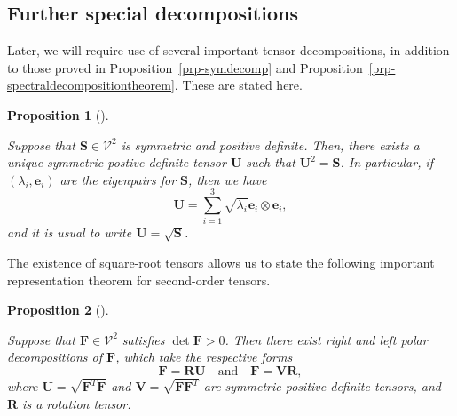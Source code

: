 \documentclass[
  letterpaper,
  DIV=11,
  numbers=noendperiod]{scrreprt}
\theoremstyle{plain}
\newtheorem{proposition}{Proposition}[chapter]
\theoremstyle{remark}
\begin{document}
\subsection{Further special
decompositions}\label{further-special-decompositions}

Later, we will require use of several important tensor decompositions,
in addition to those proved in Proposition~\ref{prp-symdecomp} and
Proposition~\ref{prp-spectraldecompositiontheorem}. These are stated
here.

\begin{proposition}[]\protect\hypertarget{prp-squareroot}{}\label{prp-squareroot}

Suppose that \({\boldsymbol{S}}\in{\mathcal{V}}^2\) is symmetric and
positive definite. Then, there exists a unique symmetric postive
definite tensor \({\boldsymbol{U}}\) such that
\({\boldsymbol{U}}^2={\boldsymbol{S}}\). In particular, if
\((\lambda_i,{\boldsymbol{e}}_i)\) are the eigenpairs for
\({\boldsymbol{S}}\), then we have
\[{\boldsymbol{U}}= \sum_{i=1}^3 \sqrt{\lambda_i}{\boldsymbol{e}}_i\otimes{\boldsymbol{e}}_i,\]
and it is usual to write \({\boldsymbol{U}}= \sqrt{{\boldsymbol{S}}}\).

\end{proposition}

The existence of square-root tensors allows us to state the following
important representation theorem for second-order tensors.

\begin{proposition}[]\protect\hypertarget{prp-polardecomposition}{}\label{prp-polardecomposition}

Suppose that \({\boldsymbol{F}}\in{\mathcal{V}}^2\) satisfies
\(\det{\boldsymbol{F}}>0\). Then there exist \emph{right} and \emph{left
polar decompositions} of \({\boldsymbol{F}}\), which take the respective
forms
\[{\boldsymbol{F}}= {\boldsymbol{R}}{\boldsymbol{U}}\quad\text{and}\quad{\boldsymbol{F}}={\boldsymbol{V}}{\boldsymbol{R}},\]
where \({\boldsymbol{U}}= \sqrt{{\boldsymbol{F}}^T{\boldsymbol{F}}}\)
and \({\boldsymbol{V}}=\sqrt{{\boldsymbol{F}}{\boldsymbol{F}}^T}\) are
symmetric positive definite tensors, and \({\boldsymbol{R}}\) is a
rotation tensor.

\end{proposition}
\end{document}
